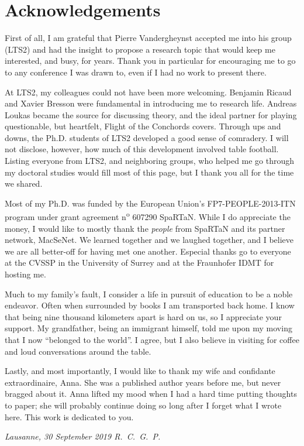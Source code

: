 \chapter*{Acknowledgements}

\vspace*{\fill}

First of all, I am grateful that Pierre Vandergheynst accepted me into his group (LTS2) and had the insight to propose a research topic that would keep me interested, and busy, for years. Thank you in particular for encouraging me to go to any conference I was drawn to, even if I had no work to present there.

\vspace*{\fill}

At LTS2, my colleagues could not have been more welcoming. Benjamin Ricaud and Xavier Bresson were fundamental in introducing me to research life. Andreas Loukas became the source for discussing theory, and the ideal partner for playing questionable, but heartfelt, Flight of the Conchords covers. Through ups and downs, the Ph.D. students of LTS2 developed a good sense of comradery. I will not disclose, however, how much of this development involved table football. Listing everyone from LTS2, and neighboring groups, who helped me go through my doctoral studies would fill most of this page, but I thank you all for the time we shared.

\vspace*{\fill}

Most of my Ph.D. was funded by the European Union's FP7-PEOPLE-2013-ITN program under grant agreement n\textsuperscript{o} 607290 SpaRTaN. While I do appreciate the money, I would like to mostly thank the \emph{people} from  SpaRTaN and its partner network, MacSeNet. We learned together and we laughed together, and I believe we are all better-off for having met one another. Especial thanks go to everyone at the CVSSP in the University of Surrey and at the Fraunhofer IDMT for hosting me.

\vspace*{\fill}

Much to my family's fault, I consider a life in pursuit of education to be a noble endeavor. Often when surrounded by books I am transported back home. I know that being nine thousand kilometers apart is hard on us, so I appreciate your support. My grandfather, being an immigrant himself, told me upon my moving that I now ``belonged to the world''. I agree, but I also believe in visiting for coffee and loud conversations around the table.

\vspace*{\fill}

Lastly, and most importantly, I would like to thank my wife and confidante extraordinaire, Anna. She was a published author years before me, but never bragged about it. Anna lifted my mood when I had a hard time putting thoughts to paper; she will probably continue doing so long after I forget what I wrote here. This work is dedicated to you.

\vspace*{\fill}

\emph{Lausanne, 30 September 2019 \hfill R.~C.~G.~P.}
